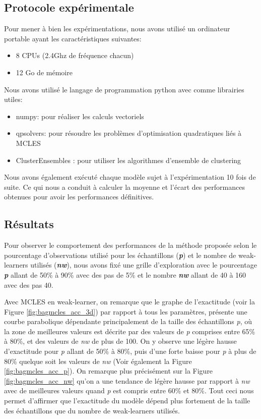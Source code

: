  \subsection{Protocole expérimentale}

    Pour mener à bien les expérimentations, nous avons utilisé un ordinateur portable ayant les caractéristiques suivantes:
	\begin{itemize}
  	  \item 8 CPUs (2.4Ghz de fréquence chacun)
  	  \item 12 Go de mémoire
	\end{itemize}

    Nous avons utilisé le langage de programmation {python} avec comme librairies utiles:
    \begin{itemize}
   	 \item numpy: pour réaliser les calculs vectoriels
   	 \item qpsolvers: pour résoudre les problèmes d'optimisation quadratiques liés à MCLES
   	 \item ClusterEnsembles : pour utiliser les algorithmes d'ensemble de clustering
    \end{itemize}

    Nous avons également exécuté chaque modèle sujet à l'expérimentation 10 fois de suite. Ce qui nous a conduit à calculer la moyenne et l'écart des performances obtenues pour avoir les performances définitives.
    
\subsection{Résultats}

	Pour observer le comportement des performances de la méthode proposée selon le pourcentage d'observations utilisé pour les échantillons (\textbf{\textit{p}}) et le nombre de weak-learners utilisés (\textbf{\textit{nw}}), nous avons fixé une grille d'exploration avec le pourcentage \textbf{\textit{p}} allant de 50\% à 90\% avec des pas de 5\% et le nombre \textbf{\textit{nw}} allant de 40 à 160 avec des pas 40.

    Avec MCLES en weak-learner, on remarque que le graphe de l'exactitude (voir la Figure \ref{fig:bagmcles_acc_3d}) par rapport à tous les paramètres, présente une courbe parabolique dépendante principalement de la taille des échantillons \textit{p}, où la zone de meilleures valeurs est décrite par des valeurs de \textit{p} comprises entre 65\% à 80\%, et des valeurs de \textit{nw} de plus de 100.
    On y observe une légère hausse d'exactitude pour \textit{p} allant de 50\% à 80\%, puis d'une forte baisse pour \textit{p} à plus de 80\% quelque soit les valeurs de \textit{nw} (Voir également la Figure \ref{fig:bagmcles_acc_p}).
    On remarque plus précisément sur la Figure \ref{fig:bagmcles_acc_nw} qu'on a une tendance de légère hausse par rapport à \textit{nw} avec de meilleures valeurs quand \textit{p} est compris entre 60\% et 80\%.
    Tout ceci nous permet d'affirmer que l'exactitude du modèle dépend plus fortement de la taille des échantillons que du nombre de weak-learners utilisés.

